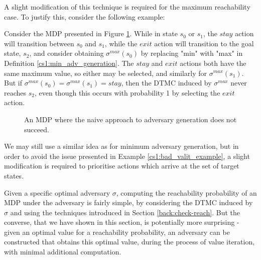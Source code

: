 A slight modification of this technique is required for the maximum reachability case. To justify this, consider the following example:

\begin{example}
\label{cs1:bad_valit_example}

Consider the MDP presented in Figure \ref{cs1:bad_mdp_figure}. While in state $s_0$ or $s_1$, the $stay$ action will transition between $s_0$ and $s_1$, while the $exit$ action will transition to the goal state, $s_2$, and consider obtaining $\sigma^{max}(s_0)$ by replacing "min" with "max" in Definition \ref{cs1:min_adv_generation}. The $stay$ and $exit$ actions both have the same maximum value, so either may be selected, and similarly for $\sigma^{max}(s_1)$. But if $\sigma^{max}(s_0) = \sigma^{max}(s_1) = stay$, then the DTMC induced by $\sigma^{max}$ never reaches $s_2$, even though this occurs with probability 1 by selecting the $exit$ action.
\begin{figure}

\centering
{}
\caption{An MDP where the naive approach to adversary generation does not succeed.}
\label{cs1:bad_mdp_figure}
\end{figure}
\end{example}

We may still use a similar idea as for minimum adversary generation, but in order to avoid the issue presented in Example \ref{cs1:bad_valit_example}, a slight modification is required to prioritise actions which arrive at the set of target states.

Given a specific optimal adversary $\sigma$, computing the reachability probability of an MDP under the adversary is fairly simple, by considering the DTMC induced by $\sigma$ and using the techniques introduced in Section \ref{back:check-reach}. But the converse, that we have shown in this section, is potentially more surprising - given an optimal value for a reachability probability, an adversary can be constructed that obtains this optimal value, during the process of value iteration, with minimal additional computation.

